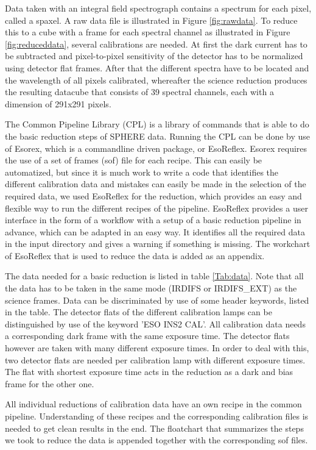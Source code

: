 \documentclass[twoside,single,12pt]{lion-msc}
\begin{document}
Data taken with an integral field spectrograph contains a spectrum for each pixel, called a spaxel. A raw data file is illustrated in Figure \ref{fig:rawdata}. To reduce this to a cube with a frame for each spectral channel as illustrated in Figure \ref{fig:reduceddata}, several calibrations are needed. At first the dark current has to be subtracted and pixel-to-pixel sensitivity of the detector has to be normalized using detector flat frames. After that the different spectra have to be located and the wavelength of all pixels calibrated, whereafter the science reduction produces the resulting datacube that consists of 39 spectral channels, each with a dimension of 291x291 pixels.
\bigskip

The Common Pipeline Library (CPL)\citep{Observatory2007} is a library of commands that is able to do the basic reduction steps of SPHERE data. Running the CPL can be done by use of Esorex, which is a commandline driven package, or EsoReflex. Esorex requires the use of a set of frames (sof) file for each recipe. This can easily be automatized, but since it is much work to write a code that identifies the different calibration data and mistakes can easily be made in the selection of the required data, we used EsoReflex for the reduction, which provides an easy and flexible way to run the different recipes of the pipeline. EsoReflex provides a user interface in the form of a workflow with a setup of a basic reduction pipeline in advance, which can be adapted in an easy way. It identifies all the required data in the input directory and gives a warning if something is missing. The workchart of EsoReflex that is used to reduce the data is added as an appendix.
\bigskip

The data needed for a basic reduction is listed in table \ref{Tab:data}. Note that all the data has to be taken in the same mode (IRDIFS or IRDIFS\_EXT) as the science frames. Data can be discriminated by use of some header keywords, listed in the table. The detector flats of the different calibration lamps can be distinguished by use of the keyword 'ESO INS2 CAL'. All calibration data needs a corresponding dark frame with the same exposure time. The detector flats however are taken with many different exposure times. In order to deal with this, two detector flats are needed per calibration lamp with different exposure times. The flat with shortest exposure time acts in the reduction as a dark and bias frame for the other one. 
\bigskip

All individual reductions of calibration data have an own recipe in the common pipeline. Understanding of these recipes and the corresponding calibration files is needed to get clean results in the end. The floatchart that summarizes the steps we took to reduce the data is appended together with the corresponding sof files.
\end{document}
